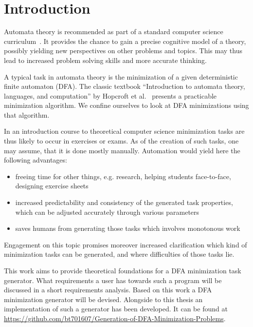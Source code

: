 
\chapter{Introduction} \label{ch:1}


Automata theory is recommended as part of a standard computer science curriculum~\cite[pp. 5-6]{GI16}. It provides the chance to gain a precise cognitive model of a theory, possibly yielding new perspectives on other problems and topics. This may thus lead to increased problem solving skills and more accurate thinking.


A typical task in automata theory is the minimization of a given deterministic finite automaton (DFA). The classic textbook ``Introduction to automata theory, languages, and computation'' by Hopcroft et al.~\cite{HMU01} presents a practicable minimization algorithm. We confine ourselves to look at DFA minimizations using that algorithm.


In an introduction course to theoretical computer science minimization tasks are thus likely to occur in exercises or exams. As of the creation of such tasks, one may assume, that it is done mostly manually. Automation would yield here the following advantages:

\begin{itemize}
	\item freeing time for other things, e.g. research, helping students face-to-face, designing exercise sheets
	
	\item increased predictability and consistency of the generated task properties, which can be adjusted accurately through various parameters
	
	\item saves humans from generating those tasks which involves monotonous work
\end{itemize}
Engagement on this topic promises moreover increased clarification which kind of minimization tasks can be generated, and where difficulties of those tasks lie.

This work aims to provide theoretical foundations for a DFA minimization task generator. What requirements a user has towards such a program will be discussed in a short requirements analysis. Based on this work a DFA minimization generator will be devised. Alongside to this thesis an implementation of such a generator has been developed. It can be found at \url{https://github.com/bt701607/Generation-of-DFA-Minimization-Problems}.
